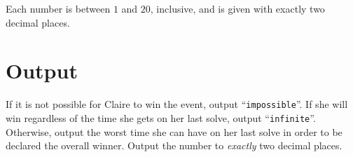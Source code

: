 Each number is between $1$ and $20$, inclusive, and is given
with exactly two decimal places.

\section*{Output}

If it is not possible for Claire to win the event, output
``\texttt{impossible}''. If she will win regardless of the time she gets
on her last solve, output ``\texttt{infinite}''. Otherwise, output the
worst time she can have on her last solve in order to be declared the
overall winner. Output the number to \emph{exactly} two decimal places.
